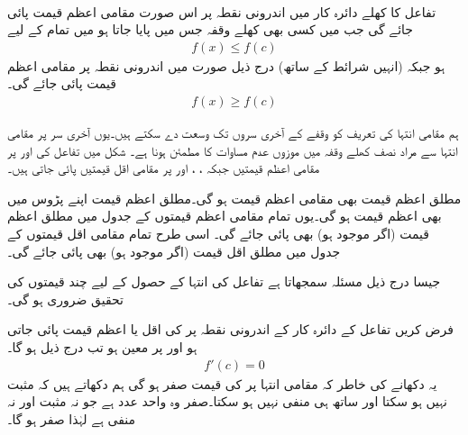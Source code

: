 
\\
تفاعل  کا کھلے دائرہ کار  میں اندرونی نقطہ  پر اس صورت مقامی اعظم قیمت پائی جائے گی جب  میں کسی بھی کھلے وقفہ جس میں  پایا جاتا ہو میں تمام  کے لیے
\begin{align*}
f(x)\le f(c)
\end{align*}
ہو جبکہ (انہیں شرائط کے ساتھ) درج ذیل صورت میں  اندرونی نقطہ  پر مقامی اعظم قیمت پائی جائے گی۔
\begin{align*}
f(x)\ge f(c)
\end{align*} 

ہم مقامی انتہا کی تعریف کو وقفے  کے آخری سروں تک وسعت دے سکتے ہیں۔یوں آخری سر  پر مقامی انتہا سے مراد نصف کھلے  وقفہ میں موزوں عدم مساوات کا مطمئن ہونا ہے۔ شکل  میں تفاعل  کی   اور  پر مقامی اعظم قیمتیں  جبکہ  ، ،  اور  پر مقامی اقل قیمتیں  پائی جاتی ہیں۔

مطلق اعظم قیمت بھی مقامی اعظم قیمت ہو گی۔مطلق اعظم قیمت اپنے  پڑوس میں بھی اعظم قیمت ہو گی۔یوں تمام مقامی اعظم قیمتوں کے جدول میں مطلق اعظم قیمت (اگر موجود ہو) بھی پائی جائے گی۔ اسی طرح تمام مقامی اقل قیمتوں کے جدول میں مطلق اقل قیمت (اگر موجود ہو) بھی پائی جائے گی۔

جیسا درج ذیل مسئلہ سمجھاتا ہے تفاعل کی   انتہا کے  حصول کے لیے  چند قیمتوں کی تحقیق ضروری ہو گی۔

فرض کریں  تفاعل  کے دائرہ کار کے  اندرونی نقطہ  پر  کی اقل یا اعظم قیمت پائی جاتی ہو اور  پر  معین ہو تب درج ذیل ہو گا۔
\begin{align*}
f'(c)=0
\end{align*} 
یہ دکھانے کی خاطر کہ مقامی انتہا پر  کی قیمت صفر ہو گی ہم  دکھاتے ہیں کہ  مثبت نہیں ہو سکتا   اور ساتھ ہی     منفی  نہیں ہو سکتا۔صفر وہ  واحد عدد ہے جو نہ مثبت اور نہ منفی ہے لہٰذا  صفر ہو گا۔   

